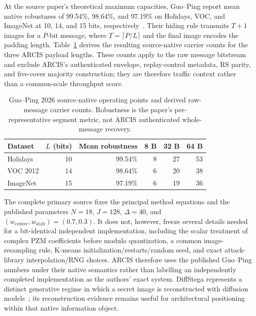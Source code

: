 At the source paper's theoretical maximum capacities, Guo--Ping report mean native robustness of 99.54\%, 98.64\%, and 97.19\% on Holidays, VOC, and ImageNet at 10, 14, and 15 bits, respectively~\cite{guo2026capacity}. Their hiding rule transmits $T+1$ images for a $P$-bit message, where $T=\lceil P/L\rceil$ and the final image encodes the padding length. Table~\ref{tab:guopingtraffic} derives the resulting source-native carrier counts for the three ARCIS payload lengths. These counts apply to the raw message bitstream and exclude ARCIS's authenticated envelope, replay-control metadata, RS parity, and five-cover majority construction; they are therefore traffic context rather than a common-scale throughput score.

\begin{table}[!htbp]
\caption{Guo--Ping 2026 source-native operating points and derived raw-message carrier counts. Robustness is the paper's per-representative segment metric, not ARCIS authenticated whole-message recovery.}
\label{tab:guopingtraffic}
\small
\begin{tabular}{lrrrrr}
\toprule
Dataset & $L$ (bits) & Mean robustness & 8 B & 32 B & 64 B\\
\midrule
Holidays & 10 & 99.54\% & 8 & 27 & 53\\
VOC 2012 & 14 & 98.64\% & 6 & 20 & 38\\
ImageNet & 15 & 97.19\% & 6 & 19 & 36\\
\bottomrule
\end{tabular}
\end{table}

The complete primary source fixes the principal method equations and the published parameters $N=18$, $J=128$, $\Delta=40$, and $(w_{\mathrm{center}},w_{\mathrm{stab}})=(0.7,0.3)$. It does not, however, freeze several details needed for a bit-identical independent implementation, including the scalar treatment of complex PZM coefficients before modulo quantization, a common image-resampling rule, K-means initialization/restarts/random seed, and exact attack-library interpolation/RNG choices. ARCIS therefore uses the published Guo--Ping numbers under their native semantics rather than labelling an independently completed implementation as the authors' exact system. DiffStega represents a distinct generative regime in which a secret image is reconstructed with diffusion models~\cite{yang2024diffstega}; its reconstruction evidence remains useful for architectural positioning within that native information object.


